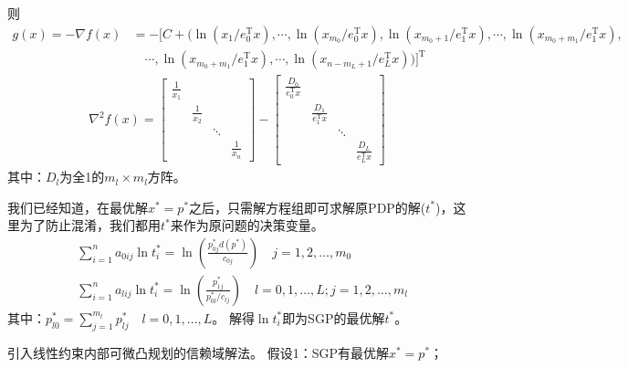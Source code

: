             则
            \begin{equation*}
            \begin{split}
            g(x)=-\nabla f(x)&=-[C+({\ln}(x_1/e_0^\mathrm{T} x),\cdots,{\ln}(x_{m_0}/e_0^\mathrm{T} x),{\ln}(x_{m_0+1}/e_1^\mathrm{T} x),\cdots,{\ln}(x_{m_0+m_1}/e_1^\mathrm{T} x),\\
            &\quad \cdots,{\ln}(x_{m_0+m_1}/e_1^\mathrm{T} x),\cdots,{\ln}(x_{n-m_L+1}/e_L^\mathrm{T} x))]^\mathrm{T}
            \end{split}
            \end{equation*}
            \begin{align*}
           {\nabla}^2 f(x)=\begin{bmatrix}
           \frac{1}{x_1}&{}&{}&{}\\
           {}&\frac{1}{x_2}&{}&{}\\
           {}&{}&\ddots&{}\\
           {}&{}&{}&\frac{1}{x_n}
           \end{bmatrix}-\begin{bmatrix}
           \frac{D_0}{e_0^\mathrm{T} x}&{}&{}&{}\\
           {}&\frac{D_1}{e_1^\mathrm{T} x}&{}&{}\\
           {}&{}&\ddots&{}\\
           {}&{}&{}&\frac{D_L}{e_L^\mathrm{T} x}
           \end{bmatrix}
            \end{align*}
            其中：$D_l$为全1的$m_l\times m_l$方阵。
            \par
            我们已经知道，在最优解$x^*=p^*$之后，只需解方程组即可求解原PDP的解($t^*$)，这里为了防止混淆，我们都用$t^*$来作为原问题的决策变量。
            \begin{align}
            \label{几何规划的决策变量}
            &\mathop{\sum}\limits_{i=1}^{n}a_{0ij}{\ln}t_i^*={\ln}\left( \frac{p_{0j}^*d(p^*)}{c_{0j}} \right) \quad j=1,2,\ldots,m_0\\
            &\mathop{\sum}\limits_{i=1}^{n}a_{lij}{\ln}t_i^*={\ln}\left( \frac{p_{1j}^*}{p_{0l}^*/c_{lj}} \right)  \quad l=0,1,\ldots,L;j=1,2,\ldots,m_l
            \end{align}
            其中：$p_{l0}^*=\mathop{\sum}\limits_{j=1}^{m_l}p_{lj}^*\quad l=0,1,\ldots,L$。
            解得${\ln}t_i^*$即为SGP的最优解$t^*$。
            \par
            引入线性约束内部可微凸规划的信赖域解法。
            假设1：SGP有最优解$x^*=p^*$；

